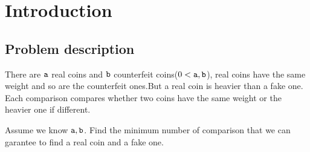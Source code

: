 \section{Introduction}
\subsection*{Problem description}
There are $\mathtt{a}$ real coins and $\mathtt{b}$ counterfeit coins($0<\mathtt{a},\mathtt{b}$),  real coins have the same weight and so are the counterfeit ones.But a real coin is heavier than a fake one.
Each comparison compares whether two coins have the same weight or the heavier one if different.

Assume we know $\mathtt{a},\mathtt{b}$.
Find the minimum number of comparison that we can garantee to find a real coin and a fake one.
